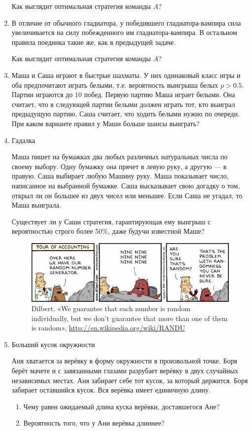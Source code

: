 \documentclass[nobib]{tufte-handout}
\begin{document}
\begin{enumerate}
Как выглядит оптимальная стратегия команды $A$?

\item В отличие от обычного гладиатора, у победившего гладиатора-вампира сила увеличивается на силу побежденного им гладиатора-вампира. В остальном правила поединка такие же, как в предыдущей задаче.

Как выглядит оптимальная стратегия команды $A$?

\item Маша и Саша играют в быстрые шахматы. У них одинаковый класс игры и оба предпочитают играть белыми, т.е. вероятность выигрыша белых  $p>0.5$. Партии играются до 10 побед. Первую партию Маша играет белыми. Она считает, что в следующей партии белыми должен играть тот, кто выиграл предыдущую партию. Саша считает, что ходить белыми нужно по очереди. При каком варианте правил у Маши больше шансы выиграть?

\item Гадалка

Маша пишет на бумажках два любых различных натуральных числа по своему выбору. Одну бумажку она прячет в левую руку, а другую --- в правую. Саша выбирает любую Машину руку. Маша показывает число, написанное на выбранной бумажке. Саша высказывает свою догадку о том, открыл ли он большее из двух чисел или меньшее. Если Саша не угадал, то Маша выиграла.

Существует ли у Саши стратегия, гарантирующая ему выигрыш с вероятностью строго более 50\%, даже будучи известной Маше?

\begin{figure}
  \includegraphics[width=17cm]{ninenine.png}
  \caption{Dilbert, «We guarantee that each number is random individually, but we don't guarantee that more than one of them is random», \url{http://en.wikipedia.org/wiki/RANDU}}
\end{figure}


\item Больший кусок окружности

Аня хватается за верёвку в форму окружности в произвольной точке. Боря берёт мачете и с завязанными глазами разрубает верёвку в двух случайных независимых местах. Аня забирает себе тот кусок, за который держится. Боря забирает оставшийся кусок.  Вся верёвка имеет единичную длину.
\begin{enumerate}
\item Чему равен ожидаемый длина куска верёвки, доставшегося Ане?
\item  Вероятность того, что у Ани верёвка длиннее?
\end{enumerate}



\end{enumerate}
\end{document}
